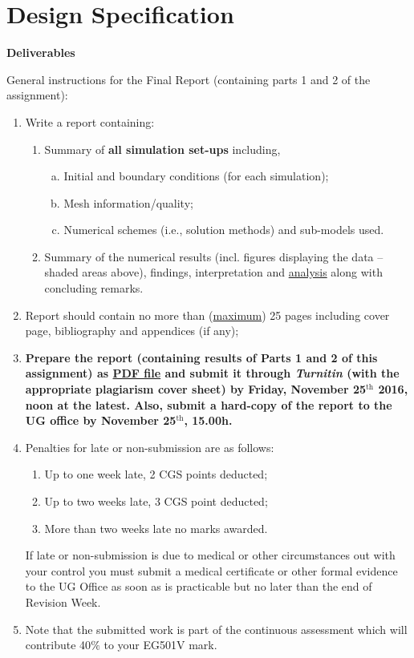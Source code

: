 \documentclass[12pts,a4paper,amsmath,amssymb,floatfix]{article}%
\begin{document}
\section{Design Specification}


\clearpage
\begin{center}
\Large{\bf Deliverables}
\end{center}
General instructions for the Final Report (containing parts 1 and 2 of the assignment):
\begin{enumerate}[1)]
  \item Write a report containing:
  \begin{enumerate}
    \item Summary of {\bf all simulation set-ups} including,
       \begin{enumerate} [(a)]
          \item Initial and boundary conditions (for each simulation);
          \item Mesh information/quality;
          \item Numerical schemes (i.e., solution methods) and sub-models used.
       \end{enumerate}
    \item Summary of the numerical results (incl. figures displaying the data -- shaded areas above), findings, interpretation and \underline{analysis} along with concluding remarks.
  \end{enumerate}
  
  \item Report should contain no more than (\underline{maximum}) 25 pages including cover page, bibliography and appendices (if any);

\item {\bf Prepare the report (containing results of Parts 1 and 2 of this assignment) as \underline{PDF file} and submit it through {\it Turnitin} (with the appropriate plagiarism cover sheet) by Friday, November 25$^{\text{th}}$ 2016, noon at the latest. Also, submit a hard-copy of the report to the UG office by November 25$^{\text{th}}$, 15.00h.}
%
%
\item Penalties for late or non-submission are as follows:
\begin{enumerate}%
\item Up to one week late, 2 CGS points deducted;
\item Up to two weeks late, 3 CGS point deducted;
\item More than two weeks late no marks awarded.
\end{enumerate}
If late or non-submission is due to medical or other circumstances out with your control you must submit a medical certificate or other formal evidence to the UG Office as soon as is practicable but no later than the end of Revision Week.


\item Note that the submitted work is part of the continuous assessment which will contribute 40$\%$ to your EG501V mark.

\end{enumerate}
\end{document}
